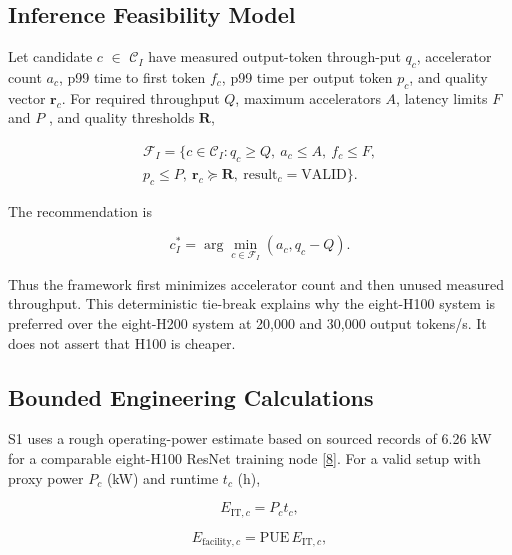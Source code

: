 \documentclass[final,3p,12pt,nopreprintline]{elsarticle}
\begin{document}
\subsection{Inference Feasibility Model}


Let candidate $c$ \ensuremath{\in} $\mathcal{C}_I$ have measured output-token through-put $q_c$, accelerator count $a_c$, p99 time to first token $f_c$, p99 time per output token $p_c$, and quality vector $\boldsymbol{r}_c$. For required throughput $Q$, maximum accelerators $A$, latency limits $F$ and $P$ , and quality thresholds $\boldsymbol{R}$,


\begin{multline}
\mathcal{F}_I=\{c\in\mathcal{C}_I:q_c\geq Q,\ a_c\leq A,\ f_c\leq F,\\
p_c\leq P,\ \boldsymbol{r}_c\succeq\boldsymbol{R},\ \text{result}_c=\mathrm{VALID}\}.
\label{eq:infset}
\end{multline}

The recommendation is


\begin{equation}
c_I^*=\arg\min_{c\in\mathcal{F}_I}(a_c,q_c-Q).
\label{eq:infrank}
\end{equation}

Thus the framework first minimizes accelerator count and then unused measured throughput. This deterministic tie-break explains why the eight-H100 system is preferred over the eight-H200 system at 20,000 and 30,000 output tokens/s. It does not assert that H100 is cheaper.


\subsection{Bounded Engineering Calculations}


S1 uses a rough operating-power estimate based on sourced records of 6.26 kW for a comparable eight-H100 ResNet training node \hyperref[ref:8]{[8]}. For a valid setup with proxy power $P_c$ (kW) and runtime $t_c$ (h),


\begin{equation}E_{\mathrm{IT},c}=P_ct_c,\end{equation}

\begin{equation}E_{\mathrm{facility},c}=\mathrm{PUE}\,E_{\mathrm{IT},c},\end{equation}
\end{document}
